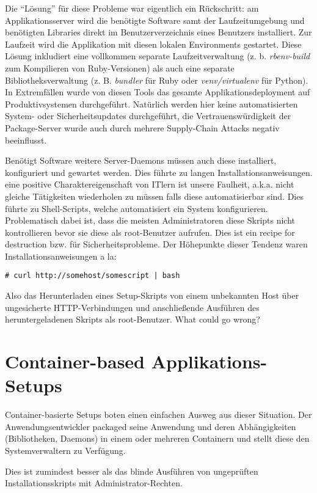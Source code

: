 Die ``Lösung'' für diese Probleme war eigentlich ein Rückschritt: am Applikationsserver wird die benötigte Software samt der Laufzeitumgebung und benötigten Libraries direkt im Benutzerverzeichnis eines Benutzers installiert. Zur Laufzeit wird die Applikation mit diesen lokalen Environments gestartet. Diese Lösung inkludiert eine vollkommen separate Laufzeitverwaltung (z. b. \textit{rbenv-build} zum Kompilieren von Ruby-Versionen) als auch eine separate Bibliotheksverwaltung (z. B. \textit{bundler} für Ruby oder \textit{venv/virtualenv} für Python). In Extremfällen wurde von diesen Tools das gesamte Applikationsdeployment auf Produktivsystemen durchgeführt. Natürlich werden hier keine automatisierten System- oder Sicherheitsupdates durchgeführt, die Vertrauenswürdigkeit der Package-Server wurde auch durch mehrere Supply-Chain Attacks negativ beeinflusst.

Benötigt Software weitere Server-Daemons müssen auch diese installiert, konfiguriert und gewartet werden. Dies führte zu langen Installationsanweisungen. eine positive Charaktereigenschaft von ITlern ist unsere Faulheit, a.k.a. nicht gleiche Tätigkeiten wiederholen zu müssen falls diese automatisierbar sind. Dies führte zu Shell-Scripts, welche automatisiert ein System konfigurieren. Problematisch dabei ist, dass die meisten Administratoren diese Skripts nicht kontrollieren bevor sie diese als root-Benutzer aufrufen. Dies ist ein recipe for destruction bzw. für Sicherheitsprobleme. Der Höhepunkte dieser Tendenz waren Installationsanweisungen a la:

\begin{verbatim}
# curl http://somehost/somescript | bash
\end{verbatim}

Also das Herunterladen eines Setup-Skripts von einem unbekannten Host über ungesicherte HTTP-Verbindungen und anschließende Ausführen des heruntergeladenen Skripts als root-Benutzer. What could go wrong?

\section{Container-based Applikations-Setups}

Container-basierte Setups boten einen einfachen Ausweg aus dieser Situation. Der Anwendungsentwickler packaged seine Anwendung und deren Abhängigkeiten (Bibliotheken, Daemons) in einem oder mehreren Containern und stellt diese den Systemverwaltern zu Verfügung.

Dies ist zumindest besser als das blinde Ausführen von ungeprüften Installationsskripts mit Administrator-Rechten.

